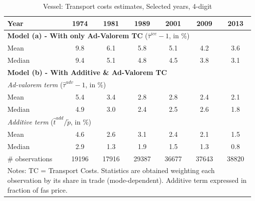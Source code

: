 \documentclass[a4paper,11pt]{article}
\begin{document}
\begin{table}[htbp]
  \centering
\caption{Vessel: Transport costs estimates, Selected years, 4-digit}
\begin{center}
  \footnotesize{
    \begin{tabular}{l|cccccc}
   \hline\hline
Year & 1974  & 1981  & 1989  & 2001  & 2009  & 2013 \\
\hline
\multicolumn{7}{l}{\textbf{Model (a) - With only Ad-Valorem TC} ($\widehat{\tau}^{ice}-1$, in \%)} \\
\hline
Mean  & 9.8 & 6.1 & 5.8 & 5.1 & 4.2 & 3.6  \\
Median & 9.4 & 5.1 & 4.8 & 4.5 & 3.8 & 3.1 \\
\hline
\multicolumn{7}{l}{\textbf{Model (b) - With Additive \& Ad-Valorem TC} }\\ \hline
\multicolumn{7}{l}{\textit{Ad-valorem term} ($\widehat{\tau}^{adv}-1$, in \%) }   \\ \hline
Mean  & 5.4 & 3.4 & 2.8 & 2.8 & 2.4 & 2.1  \\
Median & 4.9 & 3.0 & 2.4 & 2.5 & 2.6 & 1.8 \\
\hline
\multicolumn{7}{l}{\textit{Additive term} ($\widehat{t}^{add}/\widetilde{p}$, in \%) }   \\ \hline
Mean  & 4.6 & 2.6 & 3.1 & 2.4 & 2.1 & 1.5  \\
Median & 2.9 & 1.3 & 1.9 & 1.5 & 1.3 & 0.8 \\
\hline
\# observations & 19196 & 17916 & \multicolumn{1}{c}{29387} & \multicolumn{1}{c}{36677} & \multicolumn{1}{c}{37643} & \multicolumn{1}{c}{38820} \\
\hline\hline
\multicolumn{7}{l}{\parbox[l]{11cm}{ \vspace{7pt}\scriptsize{Notes: TC = Transport Costs.
Statistics are obtained weighting each observation by its share in trade (mode-dependent).
Additive term expressed in fraction of fas price.}}}
\end{tabular}%
}
\end{center}
\label{tab:result_ves_rob}%
\end{table}%
\end{document}
